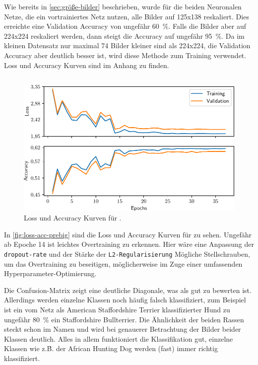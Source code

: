 Wie bereits in \autoref{sec:größe-bilder} beschrieben, wurde für die beiden
Neuronalen Netze, die ein vortrainiertes Netz nutzen, alle Bilder auf 125x138
reskaliert. Dies erreichte eine Validation Accuracy von ungefähr \SI{60}{\percent}.
Falls die Bilder aber auf 224x224 reskaliert werden, dann steigt die Accuracy
auf ungefähr \SI{95}{\percent}. Da im kleinen Datensatz nur maximal 74 Bilder
kleiner sind als 224x224, die Validation Accuracy aber deutlich besser ist, wird diese Methode zum Training verwendet.
Loss und Accuracy Kurven sind im Anhang zu finden.

\subsection{\PreBig{}}

\begin{figure}
  \centering
  \includegraphics[scale=0.8]{pics/ergebnisse/PreBigDogNN/history_epoch.pdf}
  \caption{Loss und Accuracy Kurven für \PreBig{}.}
  \label{fig:loss-acc-prebig}
\end{figure}

In \autoref{fig:loss-acc-prebig} sind die Loss und Accuracy Kurven für \PreBig{}
zu sehen. Ungefähr ab Epoche 14 ist leichtes Overtraining zu erkennen. Hier
wäre eine Anpassung der \texttt{dropout-rate} und der Stärke der \texttt{L2-Regularisierung}
Mögliche Stellschrauben, um das Overtraining zu beseitigen, möglicherweise im Zuge
einer umfassenden Hyperparameter-Optimierung.

Die Confusion-Matrix zeigt eine deutliche Diagonale, was als gut zu bewerten ist.
Allerdings werden einzelne Klassen noch häufig falsch klassifiziert, zum Beispiel
ist ein vom Netz als American Staffordshire Terrier klassifizierter Hund zu ungefähr
\SI{80}{\percent} ein Staffordshire Bullterrier. Die Ähnlichkeit der beiden Rassen
steckt schon im Namen und wird bei genauerer Betrachtung der Bilder beider Klassen
deutlich. Alles in allem funktioniert die Klassifikation gut, einzelne Klassen
wie z.\.B. der African Hunting Dog werden (fast) immer richtig klassifiziert.

